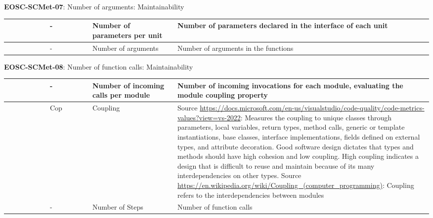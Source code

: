 \textbf{EOSC-SCMet-07}: Number of arguments: Maintainability
\nopagebreak[4]
\begin{center}
    \tabletail{\hline}
    \tiny
    \begin{supertabular}{|p{0.10\linewidth}|p{0.10\linewidth}|p{0.20\linewidth}|p{0.60\linewidth}|} \hline
        \cite{srisopha_software_2018} & - & Number of parameters per unit & Number of parameters declared in the interface of each unit\\ \hline
        \cite{tanaka_software_1998} & - & Number of arguments & Number of arguments in the functions\\ \hline
    \end{supertabular}
\end{center}

\textbf{EOSC-SCMet-08}: Number of function calls: Maintainability
\nopagebreak[4]
\begin{center}
    \tabletail{\hline}
    \tiny
    \begin{supertabular}{|p{0.10\linewidth}|p{0.10\linewidth}|p{0.20\linewidth}|p{0.60\linewidth}|} \hline
        \cite{srisopha_software_2018} & - & Number of incoming calls per module & Number of incoming invocations for each module, evaluating the module coupling property\\ \hline
        \cite{montagud_systematic_2012} & Cop & Coupling & Source \url{https://docs.microsoft.com/en-us/visualstudio/code-quality/code-metrics-values?view=vs-2022}: Measures the coupling to unique classes through parameters, local variables, return types, method calls, generic or template instantiations, base classes, interface implementations, fields defined on external types, and attribute decoration. Good software design dictates that types and methods should have high cohesion and low coupling. High coupling indicates a design that is difficult to reuse and maintain because of its many interdependencies on other types. Source \url{https://en.wikipedia.org/wiki/Coupling_(computer_programming)}: Coupling refers to the interdependencies between modules\\ \hline
        \cite{tanaka_software_1998} & - & Number of Steps & Number of function calls\\ \hline
    \end{supertabular}
\end{center}

